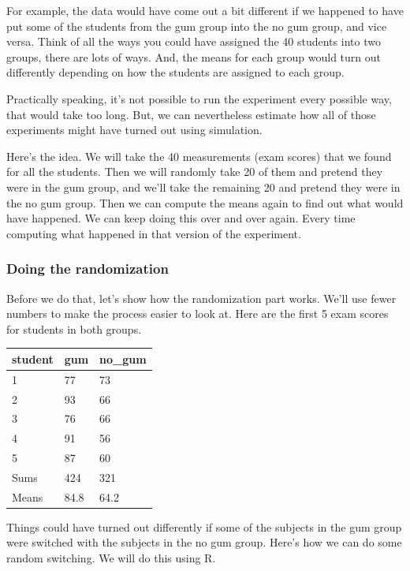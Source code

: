 \documentclass[
]{book}
\begin{document}
For example, the data would have come out a bit different if we happened to have put some of the students from the gum group into the no gum group, and vice versa. Think of all the ways you could have assigned the 40 students into two groups, there are lots of ways. And, the means for each group would turn out differently depending on how the students are assigned to each group.

Practically speaking, it's not possible to run the experiment every possible way, that would take too long. But, we can nevertheless estimate how all of those experiments might have turned out using simulation.

Here's the idea. We will take the 40 measurements (exam scores) that we found for all the students. Then we will randomly take 20 of them and pretend they were in the gum group, and we'll take the remaining 20 and pretend they were in the no gum group. Then we can compute the means again to find out what would have happened. We can keep doing this over and over again. Every time computing what happened in that version of the experiment.

\subsubsection{Doing the randomization}\label{doing-the-randomization}

Before we do that, let's show how the randomization part works. We'll use fewer numbers to make the process easier to look at. Here are the first 5 exam scores for students in both groups.

\begin{tabular}{l|l|l}
\hline
student & gum & no\_gum\\
\hline
1 & 77 & 73\\
\hline
2 & 93 & 66\\
\hline
3 & 76 & 66\\
\hline
4 & 91 & 56\\
\hline
5 & 87 & 60\\
\hline
Sums & 424 & 321\\
\hline
Means & 84.8 & 64.2\\
\hline
\end{tabular}

Things could have turned out differently if some of the subjects in the gum group were switched with the subjects in the no gum group. Here's how we can do some random switching. We will do this using R.
\end{document}
